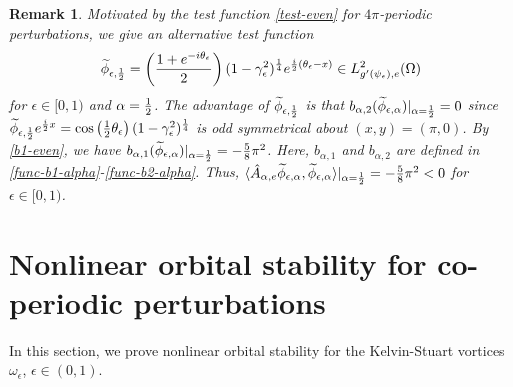\documentclass[1 [leqno, 11pt]{amsart}
\numberwithin{equation}{section}
\let\ep=\epsilon
\newtheorem{remark}[Theorem]{Remark}
\begin{document}
\begin{CJK*}{GBK}{song}
\begin{remark}
Motivated by the test function \eqref{test-even} for  $4\pi$-periodic perturbations, we give an alternative test function
 \begin{align*}
 \widetilde\phi_{\ep,{1\over2}} =\left({1+e^{-i\theta_\ep}\over 2}\right)(1-\gamma_\ep^2)^{1\over4}e^{{i\over2}(\theta_\ep-x)}\in L^2_{{g'(\psi_\ep)},e}(\Omega)
 \end{align*}
 for $\ep\in[0,1)$ and $\alpha={1\over2}$. The advantage of $ \widetilde\phi_{\ep,{1\over2}}$ is that  $b_{\alpha, 2}(\widetilde\phi_{\ep,\alpha})|_{\alpha={1\over2}}=0$ since $ \widetilde\phi_{\ep,{1\over2}} e^{{i\over2}x}=\cos\left({1\over2}\theta_\ep\right)(1-\gamma_\ep^2)^{1\over 4}$ is odd symmetrical about $(x,y)=(\pi,0)$.
 By \eqref{b1-even}, we have $b_{\alpha, 1}(\widetilde\phi_{\ep,\alpha})|_{\alpha={1\over2}}=-{5\over8}\pi^2$.
 Here, $b_{\alpha, 1}$ and $b_{\alpha, 2}$ are defined in \eqref{func-b1-alpha}-\eqref{func-b2-alpha}. Thus,
 $\langle\hat{A}_{\alpha,e} \widetilde\phi_{\ep,\alpha}, \widetilde\phi_{\ep,\alpha} \rangle|_{\alpha={1\over2}}=-{5\over8}\pi^2<0$ for $\ep\in[0,1)$.
\end{remark}






\section{Nonlinear orbital stability for co-periodic perturbations}\label{Sec-Nonlinear orbital stability for co-periodic perturbations}

In this section, we prove  nonlinear orbital stability for the Kelvin-Stuart vortices  $\omega_\ep$, $\ep\in(0,1)$.


\end{CJK*}
\end{document}
